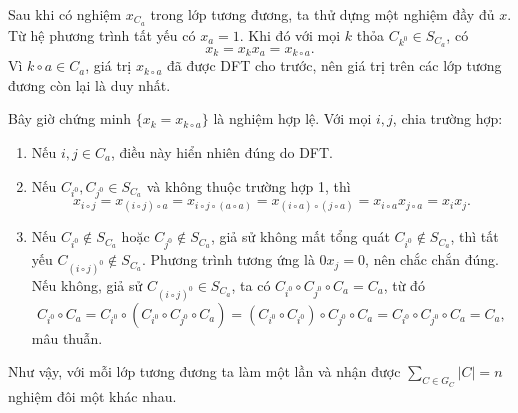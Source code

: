 \documentclass[11pt]{article}
\begin{document}
Sau khi có nghiệm \(x_{C_a}\) trong lớp tương đương, ta thử dựng một nghiệm đầy
đủ \(x\). Từ hệ phương trình tất yếu có \(x_a=1\). Khi đó với mọi
\(k\) thỏa \(C_{k^0}\in S_{C_a}\), có
\[
  x_k=x_kx_a=x_{k\circ a}.
\]
Vì \(k\circ a\in C_a\), giá trị \(x_{k\circ a}\) đã được DFT cho trước, nên giá
trị trên các lớp tương đương còn lại là duy nhất.

Bây giờ chứng minh \(\{x_k=x_{k\circ a}\}\) là nghiệm hợp lệ. Với mọi \(i,j\),
chia trường hợp:
\begin{enumerate}
  \item Nếu \(i,j\in C_a\), điều này hiển nhiên đúng do DFT.
  \item Nếu \(C_{i^0},C_{j^0}\in S_{C_a}\) và không thuộc trường hợp 1, thì
  \[
    x_{i\circ j}=x_{(i\circ j)\circ a}
    =x_{i\circ j\circ(a\circ a)}
    =x_{(i\circ a)\circ(j\circ a)}
    =x_{i\circ a}x_{j\circ a}=x_ix_j.
  \]
  \item Nếu \(C_{i^0}\notin S_{C_a}\) hoặc \(C_{j^0}\notin S_{C_a}\), giả sử
  không mất tổng quát \(C_{i^0}\notin S_{C_a}\), thì tất yếu
  \(C_{(i\circ j)^0}\notin S_{C_a}\). Phương trình tương ứng là \(0x_j=0\), nên
  chắc chắn đúng. Nếu không, giả sử \(C_{(i\circ j)^0}\in S_{C_a}\), ta có
  \(C_{i^0}\circ C_{j^0}\circ C_a=C_a\), từ đó
  \[
    C_{i^0}\circ C_a
    =
    C_{i^0}\circ(C_{i^0}\circ C_{j^0}\circ C_a)
    =
    (C_{i^0}\circ C_{i^0})\circ C_{j^0}\circ C_a
    =
    C_{i^0}\circ C_{j^0}\circ C_a=C_a,
  \]
  mâu thuẫn.
\end{enumerate}

Như vậy, với mỗi lớp tương đương ta làm một lần và nhận được
\(\sum_{C\in G_C}|C|=n\) nghiệm đôi một khác nhau.
\end{document}
